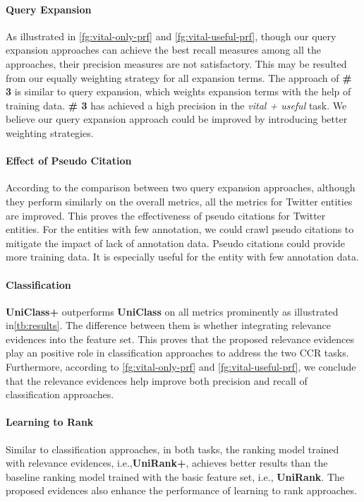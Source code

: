 \documentclass{sig-alternate}
\begin{document}
\paragraph{Query Expansion}
As illustrated in \autoref{fg:vital-only-prf} and \autoref{fg:vital-useful-prf}, though our query expansion approaches can achieve the best recall measures among all the approaches, their precision measures are not satisfactory. This may be resulted from our equally weighting strategy for all expansion terms. The approach of \textbf{\# 3} is similar to query expansion, which weights expansion terms with the help of training data. \textbf{\# 3} has achieved a high precision in the \textit{vital + useful} task. We believe our query expansion approach could be improved by introducing better weighting strategies.
\paragraph{Effect of Pseudo Citation}
According to the comparison between two query expansion approaches, although they perform similarly on the overall metrics, all the metrics for Twitter entities are improved. This proves the effectiveness of pseudo citations for Twitter entities. For the entities with few annotation, we could crawl pseudo citations to mitigate the impact of lack of annotation data. Pseudo citations could provide more training data. It is especially useful for the entity with few annotation data.
\paragraph{Classification}
\textbf{UniClass+} outperforms \textbf{UniClass} on all metrics prominently as illustrated in\autoref{tb:results}. The difference between them is whether integrating relevance evidences into the feature set. This proves that the proposed relevance evidences play an positive role in classification approaches to address the two CCR tasks. Furthermore, according to \autoref{fg:vital-only-prf} and \autoref{fg:vital-useful-prf}, we conclude that the relevance evidences help improve both precision and recall of classification approaches.
\paragraph{Learning to Rank}
Similar to classification approaches, in both tasks, the ranking model trained with relevance evidences, i.e.,\textbf{UniRank+}, achieves better results than the baseline ranking model trained with the basic feature set, i.e., \textbf{UniRank}. The proposed evidences also enhance the performance of learning to rank approaches. 
\end{document}
